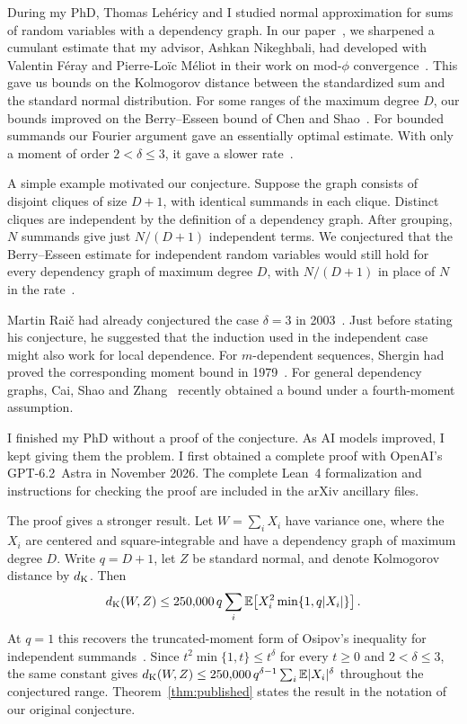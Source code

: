 During my PhD, Thomas Lehéricy and I studied normal approximation for sums
of random variables with a dependency graph.
In our paper~\cite[Lemma~5.1]{JL}, we sharpened a cumulant
estimate that my advisor, Ashkan Nikeghbali, had developed with Valentin
Féray and Pierre-Loïc Méliot in their work on mod-$\phi$
convergence~\cite[Theorem~9.8]{FMN}. This gave us bounds on the Kolmogorov
distance between the standardized sum and the standard normal distribution.
For some ranges of the maximum degree $D$, our bounds improved on the
Berry--Esseen bound of Chen and Shao~\cite[Theorem~2.7]{ChenShao}.
For bounded summands our Fourier argument gave an essentially optimal
estimate. With only a moment of order $2<\delta\le 3$, it gave a slower
rate~\cite[Theorems~2.1 and~2.4 and Section~4]{JL}.

A simple example motivated our conjecture. Suppose the graph consists of
disjoint cliques of size $D+1$, with identical summands in each clique.
Distinct cliques are independent by the definition of a dependency graph.
After grouping, $N$ summands give just $N/(D+1)$ independent terms. We
conjectured that the Berry--Esseen estimate for independent random variables
would still hold for every dependency graph of maximum degree $D$, with
$N/(D+1)$ in place of $N$ in the rate~\cite[Conjecture~1.4]{JL}.

Martin Raič had already conjectured the case $\delta=3$ in
2003~\cite[Conjecture~5.4]{Raic}. Just before stating his conjecture, he
suggested that the induction used in the independent case might also work
for local dependence. For $m$-dependent sequences, Shergin had proved the
corresponding moment bound in 1979~\cite[Theorem~2]{Shergin}. For general
dependency graphs, Cai, Shao and Zhang~\cite[Theorem~3.1]{CSZ} recently
obtained a bound under a fourth-moment assumption.

I finished my PhD without a proof of the conjecture. As AI models improved,
I kept giving them the problem. I first obtained a complete proof with
OpenAI's GPT-6.2~Astra in November 2026. The complete Lean~4 formalization
and instructions for checking the proof are included in the arXiv ancillary files.

The proof gives a stronger result. Let $W=\sum_i X_i$ have variance one,
where the $X_i$ are centered and square-integrable and have a dependency
graph of maximum degree $D$. Write $q=D+1$, let $Z$ be standard normal,
and denote Kolmogorov distance by $d_{\mathrm K}$. Then
\[
 d_{\mathrm K}(W,Z)\le 250{,}000\,q\sum_i
 \mathbb E\!\left[X_i^2\min\{1,q|X_i|\}\right].
\]
At $q=1$ this recovers the truncated-moment form of Osipov's inequality
for independent summands~\cite{Osipov}. Since $t^2\min\{1,t\}\le t^\delta$
for every $t\ge0$ and $2<\delta\le3$, the same constant gives
$d_{\mathrm K}(W,Z)\le 250{,}000\,q^{\delta-1}\sum_i\mathbb E|X_i|^\delta$ throughout
the conjectured range. Theorem~\ref{thm:published} states the result in
the notation of our original conjecture.

